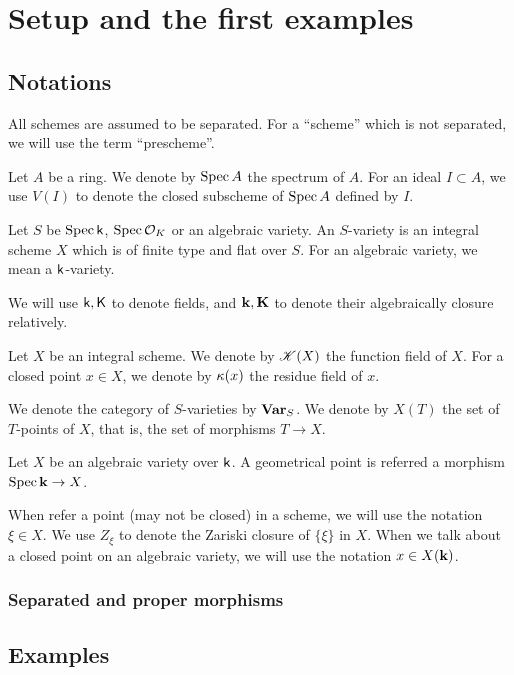 \section{Setup and the first examples}
\subsection{Notations}

    All schemes are assumed to be separated.
    For a ``scheme'' which is not separated, we will use the term ``prescheme''.

    Let $A$ be a ring.
    We denote by $\operatorname{Spec} A$ the spectrum of $A$.
    For an ideal $I \subset A$, we use $V(I)$ to denote the closed subscheme of $\operatorname{Spec} A$ defined by $I$.
 
    Let $S$ be $\operatorname{Spec} {\mathsf{k}}$, $\operatorname{Spec} {\mathcal{O}}_K$ or an algebraic variety.
    An $S$-variety is an integral scheme $X$ which is of finite type and flat over $S$.
    For an algebraic variety, we mean a ${\mathsf{k}}$-variety.

    We will use ${\mathsf{k}},{\mathsf{K}}$ to denote fields, and ${\mathbf{k}},{\mathbf{K}}$ to denote their algebraically closure relatively.

    Let $X$ be an integral scheme.
    We denote by ${\mathscr{K}}(X)$ the function field of $X$.
    For a closed point $x \in X$, we denote by ${\kappa}(x)$ the residue field of $x$.

    We denote the category of $S$-varieties by $\mathbf{Var}_S$.
    We denote by $X(T)$ the set of $T$-points of $X$, that is, the set of morphisms $T \to X$.

    Let $X$ be an algebraic variety over ${\mathsf{k}}$.
    A geometrical point is referred a morphism $\operatorname{Spec} {\mathbf{k}} \to X$.

    When refer a point (may not be closed) in a scheme, we will use the notation $\xi \in X$.
    We use $Z_\xi$ to denote the Zariski closure of $\{\xi\}$ in $X$.
    When we talk about a closed point on an algebraic variety, we will use the notation $x \in X({\mathbf{k}})$.

    \subsubsection{Separated and proper morphisms}


\subsection{Examples}


